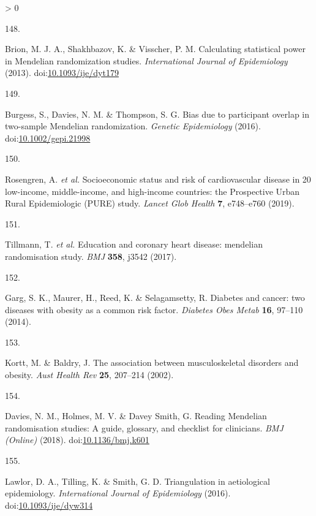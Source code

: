 \documentclass[11pt,twoside]{bristolthesis}
\newlength{\cslhangindent}
\newlength{\csllabelwidth}
\newenvironment{CSLReferences}[2] %
 {%
  \setlength{\parindent}{0pt}
  \ifodd #1 \everypar{\setlength{\hangindent}{\cslhangindent}}\ignorespaces\fi
  \ifnum #2 > 0
  \setlength{\parskip}{#2\baselineskip}
  \fi
 }%
 {}
\newcommand{\CSLLeftMargin}[1]{\parbox[t]{\csllabelwidth}{#1}}
\newcommand{\CSLRightInline}[1]{\parbox[t]{\linewidth - \csllabelwidth}{#1}\break}
\begin{document}
\begin{CSLReferences}{0}{0}
\leavevmode\hypertarget{ref-Brion2013}{}%
\CSLLeftMargin{148. }
\CSLRightInline{Brion, M. J. A., Shakhbazov, K. \& Visscher, P. M. {Calculating statistical power in Mendelian randomization studies}. \emph{International Journal of Epidemiology} (2013). doi:\href{https://doi.org/10.1093/ije/dyt179}{10.1093/ije/dyt179}}

\leavevmode\hypertarget{ref-Burgess2016}{}%
\CSLLeftMargin{149. }
\CSLRightInline{Burgess, S., Davies, N. M. \& Thompson, S. G. {Bias due to participant overlap in two-sample Mendelian randomization}. \emph{Genetic Epidemiology} (2016). doi:\href{https://doi.org/10.1002/gepi.21998}{10.1002/gepi.21998}}

\leavevmode\hypertarget{ref-Rosengren2019}{}%
\CSLLeftMargin{150. }
\CSLRightInline{Rosengren, A. \emph{et al.} {Socioeconomic status and risk of cardiovascular disease in 20 low-income, middle-income, and high-income countries: the Prospective Urban Rural Epidemiologic (PURE) study}. \emph{Lancet Glob Health} \textbf{7}, e748--e760 (2019).}

\leavevmode\hypertarget{ref-Tillmann2017}{}%
\CSLLeftMargin{151. }
\CSLRightInline{Tillmann, T. \emph{et al.} {Education and coronary heart disease: mendelian randomisation study}. \emph{BMJ} \textbf{358}, j3542 (2017).}

\leavevmode\hypertarget{ref-Garg2014}{}%
\CSLLeftMargin{152. }
\CSLRightInline{Garg, S. K., Maurer, H., Reed, K. \& Selagamsetty, R. {Diabetes and cancer: two diseases with obesity as a common risk factor}. \emph{Diabetes Obes Metab} \textbf{16}, 97--110 (2014).}

\leavevmode\hypertarget{ref-Kortt2002}{}%
\CSLLeftMargin{153. }
\CSLRightInline{Kortt, M. \& Baldry, J. {The association between musculoskeletal disorders and obesity}. \emph{Aust Health Rev} \textbf{25}, 207--214 (2002).}

\leavevmode\hypertarget{ref-Davies2018}{}%
\CSLLeftMargin{154. }
\CSLRightInline{Davies, N. M., Holmes, M. V. \& Davey Smith, G. {Reading Mendelian randomisation studies: A guide, glossary, and checklist for clinicians}. \emph{BMJ (Online)} (2018). doi:\href{https://doi.org/10.1136/bmj.k601}{10.1136/bmj.k601}}

\leavevmode\hypertarget{ref-Lawlor2016}{}%
\CSLLeftMargin{155. }
\CSLRightInline{Lawlor, D. A., Tilling, K. \& Smith, G. D. {Triangulation in aetiological epidemiology}. \emph{International Journal of Epidemiology} (2016). doi:\href{https://doi.org/10.1093/ije/dyw314}{10.1093/ije/dyw314}}


\end{CSLReferences}
\end{document}
